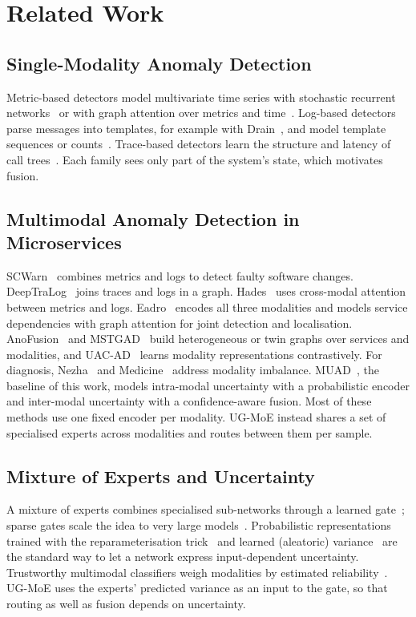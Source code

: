 \documentclass[journal]{IEEEtran}
\newcommand{\ugmoe}{UG-MoE}
\begin{document}
\section{Related Work}
\label{sec:related}

\subsection{Single-Modality Anomaly Detection}
Metric-based detectors model multivariate time series with stochastic recurrent
networks~\cite{su2019omnianomaly} or with graph attention over metrics and time~\cite{zhao2020mtadgat,deng2021gdn}.
Log-based detectors parse messages into templates, for example with Drain~\cite{he2017drain}, and model
template sequences or counts~\cite{du2017deeplog,meng2019loganomaly,zhang2019logrobust}. Trace-based
detectors learn the structure and latency of call trees~\cite{liu2020traceanomaly,zhang2022tracecrl}. Each
family sees only part of the system's state, which motivates fusion.

\subsection{Multimodal Anomaly Detection in Microservices}
SCWarn~\cite{zhao2021scwarn} combines metrics and logs to detect faulty software changes.
DeepTraLog~\cite{zhang2022deeptralog} joins traces and logs in a graph. Hades~\cite{lee2023hades} uses
cross-modal attention between metrics and logs. Eadro~\cite{lee2023eadro} encodes all three modalities and
models service dependencies with graph attention for joint detection and localisation.
AnoFusion~\cite{zhao2023anofusion} and MSTGAD~\cite{huang2023mstgad} build heterogeneous or twin graphs over
services and modalities, and UAC-AD~\cite{liu2024uacad} learns modality representations contrastively. For
diagnosis, Nezha~\cite{yu2023nezha} and Medicine~\cite{tao2024medicine} address modality imbalance. MUAD~\cite{dou2026muad},
the baseline of this work, models intra-modal uncertainty with a probabilistic encoder and inter-modal
uncertainty with a confidence-aware fusion. Most of these methods use one fixed encoder per modality.
\ugmoe{} instead shares a set of specialised experts across modalities and routes between them per sample.

\subsection{Mixture of Experts and Uncertainty}
A mixture of experts combines specialised sub-networks through a learned gate~\cite{jacobs1991moe}; sparse
gates scale the idea to very large models~\cite{shazeer2017moe}. Probabilistic representations trained
with the reparameterisation trick~\cite{kingma2014vae} and learned (aleatoric) variance~\cite{kendall2017uncertainties}
are the standard way to let a network express input-dependent uncertainty. Trustworthy multimodal
classifiers weigh modalities by estimated reliability~\cite{han2021tmc,han2022mmdynamics,corbiere2019confidnet}.
\ugmoe{} uses the experts' predicted variance as an input to the gate, so that routing as well as fusion
depends on uncertainty.
\end{document}
